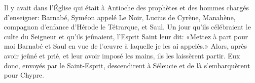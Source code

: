 Il y avait dans l’Église qui était à Antioche
	des prophètes et des hommes chargés d’enseigner:
	Barnabé, Syméon appelé Le Noir, Lucius de Cyrène,
	Manahène, compagnon d’enfance d’Hérode le Tétrarque, et Saul.
Un jour qu’ils célébraient le culte du Seigneur et qu’ils jeûnaient,
	l’Esprit Saint leur dit:
	«Mettez à part pour moi Barnabé et Saul
	en vue de l’œuvre à laquelle je les ai appelés.»
Alors, après avoir jeûné et prié, et leur avoir imposé les mains,
	ils les laissèrent partir.
Eux donc, envoyés par le Saint-Esprit,
	descendirent à Séleucie et de là s’embarquèrent pour Chypre.
